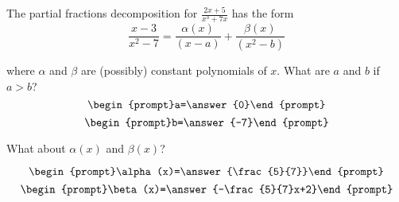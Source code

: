 \documentclass{ximera}
\author{Gregory Hartman \and Matthew Carr}
\begin{document}
\begin{exercise}




The partial fractions decomposition for $\frac{2x+5}{x^3+7x}$ has the form 
\[
\frac{x-3}{x^2-7}=\frac{\alpha(x)}{(x-a)}+\frac{\beta(x)}{(x^2-b)}
\]

where $\alpha$ and $\beta$ are (possibly) constant polynomials of $x$. What are $a$ and $b$ if $a>b$?
\[
\begin{prompt}a=\answer{0}\end{prompt}
\]
\[
\begin{prompt}b=\answer{-7}\end{prompt}
\]

What about $\alpha(x)$ and $\beta(x)$? 

\[
\begin{prompt}\alpha(x)=\answer{\frac{5}{7}}\end{prompt}
\]
\[
\begin{prompt}\beta(x)=\answer{-\frac{5}{7}x+2}\end{prompt}
\]


\end{exercise}
\end{document}
